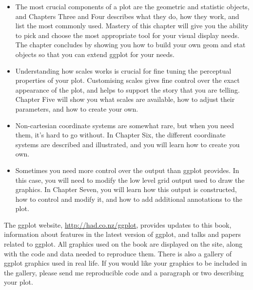 \begin{itemize}
	\item The most crucial components of a plot are the geometric and statistic objects, and Chapters Three and Four describes what they do, how they work, and list the most commonly used.  Mastery of this chapter will give you the ability to pick and choose the most appropriate tool for your visual display needs.  The chapter concludes by showing you how to build your own geom and stat objects so that you can extend ggplot for your needs.

	\item Understanding how scales works is crucial for fine tuning the perceptual properties of your plot.  Customising scales gives fine control over the exact appearance of the plot, and helps to support the story that you are telling.  Chapter Five will show you what scales are available, how to adjust their parameters, and how to create your own.

	\item Non-cartesian coordinate systems are somewhat rare, but when you need them, it's hard to go without.  In Chapter Six, the different coordinate systems are described and illustrated, and you will learn how to create you own.
	
	
	\item Sometimes you need more control over the output than ggplot provides.  In this case, you will need to modify the low level grid output used to draw the graphics.  In Chapter Seven, you will learn how this output is constructed, how to control and modify it, and how to add additional annotations to the plot.

\end{itemize}

The ggplot website, \url{http://had.co.nz/ggplot}, provides updates to this book, information about features in the latest version of ggplot, and talks and papers related to ggplot.  All graphics used on the book are displayed on the site, along with the code and data needed to reproduce them.  There is also a gallery of ggplot graphics used in real life.  If you would like your graphics to be included in the gallery, please send me reproducible code and a paragraph or two describing your plot.

